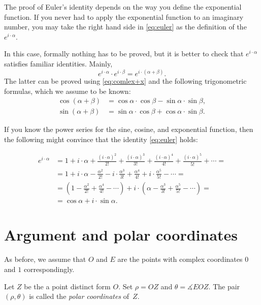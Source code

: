 The proof of Euler's identity depends on the way you define the exponential function.
If you never had to apply the exponential function to an imaginary number,
you may take the right hand side in \ref{eq:euler} 
as the definition of the $e^{i\cdot\alpha}$.

In this case, formally nothing has to be proved,
but it is better to check that $e^{i\cdot\alpha}$ satisfies familiar identities.
Mainly,
$$e^{i\cdot \alpha}\cdot e^{i\cdot \beta}= e^{i\cdot(\alpha+\beta)}.$$
The latter can be proved using \ref{eq:comlex+x} and the following trigonometric formulas,
which we assume to be known:
\begin{align*}
\cos(\alpha+\beta)&=\cos\alpha\cdot\cos\beta-\sin\alpha\cdot\sin\beta,
\\
\sin(\alpha+\beta)&=\sin\alpha\cdot\cos\beta+\cos\alpha\cdot\sin\beta.
\end{align*}

If you know the power series for the sine, cosine, and exponential function, then the following might convince that the identity \ref{eq:euler} holds:

\begin{align*}
 e^{i\cdot \alpha } &{}= 1 + i\cdot \alpha  + \frac{(i\cdot \alpha )^2}{2!} + \frac{(i\cdot \alpha  )^3}{3!} + \frac{(i\cdot \alpha )^4}{4!} + \frac{(i\cdot  \alpha )^5}{5!} +  \cdots =
 \\
&= 1 + i\cdot \alpha  - \frac{\alpha ^2}{2!} - i\cdot\frac{ \alpha ^3}{3!} + \frac{\alpha ^4}{4!} + i\cdot\frac{ \alpha ^5}{5!} -  \cdots =
\\
&= \left( 1 - \frac{\alpha ^2}{2!} + \frac{\alpha ^4}{4!}  - \cdots \right) +  i\cdot\left( \alpha  - \frac{\alpha ^3}{3!} + \frac{\alpha ^5}{5!} -  \cdots \right) =
\\
&= \cos \alpha  +  i\cdot\sin \alpha.
\end{align*}

\section*{Argument and polar coordinates}

As before, we assume that $O$ and $E$ are the points with complex coordinates $0$ and $1$ correspondingly.

Let $Z$ be the a point distinct form $O$.
Set $\rho=OZ$ and $\theta=\measuredangle EOZ$.
The pair $(\rho,\theta)$ is called the \emph{polar coordinates} of~$Z$.

